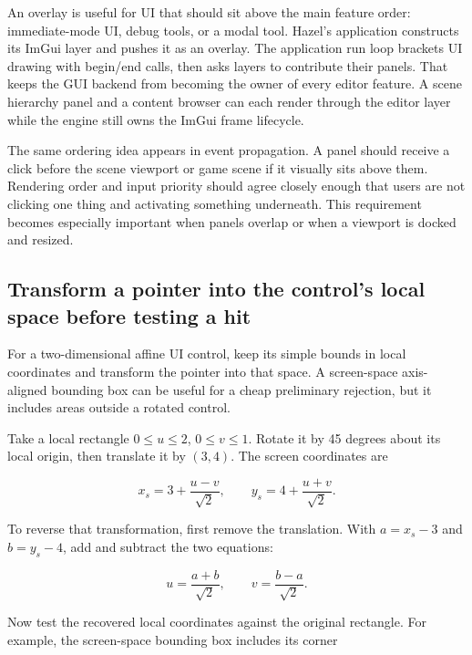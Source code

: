 \hypertarget{05-engine-i-ch013-overlays-and-the-editor}{}

An overlay is useful for UI that should sit above the main feature order: immediate-mode UI, debug tools, or a modal tool. Hazel's application constructs its ImGui layer and pushes it as an overlay. The application run loop brackets UI drawing with begin/end calls, then asks layers to contribute their panels. That keeps the GUI backend from becoming the owner of every editor feature. A scene hierarchy panel and a content browser can each render through the editor layer while the engine still owns the ImGui frame lifecycle.

The same ordering idea appears in event propagation. A panel should receive a click before the scene viewport or game scene if it visually sits above them. Rendering order and input priority should agree closely enough that users are not clicking one thing and activating something underneath. This requirement becomes especially important when panels overlap or when a viewport is docked and resized.

\subsection{Transform a pointer into the control's local space before testing a hit}\label{05-engine-i-ch013-transform-a-pointer-into-the-controls-local-space-before-testing-a-hit}

\hypertarget{05-engine-i-ch013-transform-a-pointer-into-the-controls-local-space-before-testing-a-hit}{}

For a two-dimensional affine UI control, keep its simple bounds in local coordinates and transform the pointer into that space. A screen-space axis-aligned bounding box can be useful for a cheap preliminary rejection, but it includes areas outside a rotated control.

Take a local rectangle \(0\leq u\leq2\), \(0\leq v\leq1\). Rotate it by 45 degrees about its local origin, then translate it by \((3,4)\). The screen coordinates are

\[
x_s=3+\frac{u-v}{\sqrt2},\qquad
y_s=4+\frac{u+v}{\sqrt2}.
\]

To reverse that transformation, first remove the translation. With \(a=x_s-3\) and \(b=y_s-4\), add and subtract the two equations:

\[
u=\frac{a+b}{\sqrt2},\qquad
v=\frac{b-a}{\sqrt2}.
\]

Now test the recovered local coordinates against the original rectangle. For example, the screen-space bounding box includes its corner

